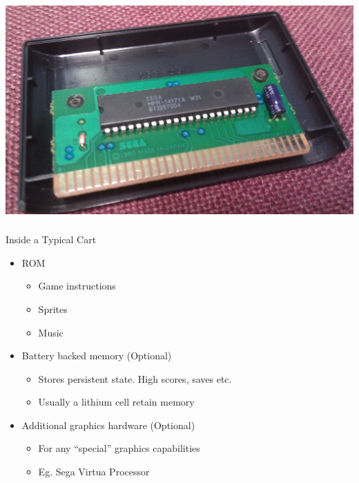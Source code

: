 \documentclass{beamer}
\begin{document}
\begin{frame}[fragile]
\frametitle{\insertsubsection}

\begin{center}
\includegraphics[height=0.8\textheight]{img/inside_cart.jpg}
\end{center}

\end{frame}


\begin{frame}[fragile]

\frametitle{\insertsubsection}

\begin{block}{Inside a Typical Cart}
\begin{itemize}
\item ROM
\begin{itemize}
\item Game instructions
\item Sprites
\item Music
\end{itemize}
\vfill

\item Battery backed memory (Optional)
\begin{itemize}
\item Stores persistent state. High scores, saves etc.
\item Usually a lithium cell retain memory
\end{itemize}
\vfill

\item Additional graphics hardware (Optional)
\begin{itemize}
\item For any ``special'' graphics capabilities
\item Eg. Sega Virtua Processor
\end{itemize}
\end{itemize}
\end{block}

\end{frame}
\end{document}
